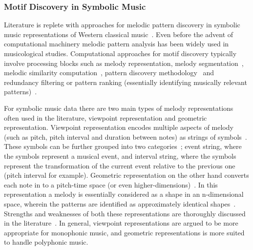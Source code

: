 \subsubsection{Motif Discovery in Symbolic Music}
\label{sec:motif_in_symbolic_music}

Literature is replete with approaches for melodic pattern discovery in symbolic music representations of Western classical music~\citep{cambouropoulos1997towards,meredith2006point,conklin2001representation,Lartillot2005b}. Even before the advent of computational machinery melodic pattern analysis has been widely used in musicological studies. Computational approaches for motif discovery typically involve processing blocks such as melody representation\citep{meredith2006point}, melody segmentation~\citep{Cambouropoulos2006}, melodic similarity computation~\citep{Cambouropoulos2001,Marsden2012}, pattern discovery methodology~\citep{collins2013siarct,meredith2002algorithms} and redundancy filtering or pattern ranking (essentially identifying musically relevant patterns)~\citep{Lartillot2005,conklin2010discovery}. 

For symbolic music data there are two main types of melody representations often used in the literature, viewpoint representation and geometric representation. Viewpoint representation encodes multiple aspects of melody (such as pitch, pitch interval and duration between notes) as strings of symbols~\citep{conklin2001representation,conklin1995multiple}. These symbols can be further grouped into two categories~\citep{meredith2002algorithms}; event string, where the symbols represent a musical event, and interval string, where the symbols represent the transformation of the current event relative to the previous one (pitch interval for example). Geometric representation on the other hand converts each note in to a pitch-time space (or even higher-dimensions)~\citep{meredith2002algorithms}. In this representation a melody is essentially considered as a shape in an n-dimensional space, wherein the patterns are identified as approximately identical shapes~\citep{meredith2002algorithms}. Strengths and weaknesses of both these representations are thoroughly discussed in the literature~\citep{Cambouropoulos2009,meredith2002algorithms}. In general, viewpoint representations are argued to be more appropriate for monophonic music, and geometric representations is more suited to handle polyphonic music. 

